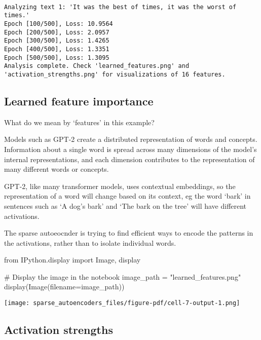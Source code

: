 \documentclass[
  letterpaper,
  DIV=11,
  numbers=noendperiod]{scrreprt}
\newenvironment{Shaded}{\begin{snugshade}}{\end{snugshade}}
\newcommand{\CommentTok}[1]{\textcolor[rgb]{0.37,0.37,0.37}{#1}}
\newcommand{\ImportTok}[1]{\textcolor[rgb]{0.00,0.46,0.62}{#1}}
\newcommand{\NormalTok}[1]{\textcolor[rgb]{0.00,0.23,0.31}{#1}}
\newcommand{\OperatorTok}[1]{\textcolor[rgb]{0.37,0.37,0.37}{#1}}
\newcommand{\StringTok}[1]{\textcolor[rgb]{0.13,0.47,0.30}{#1}}
\begin{document}
\begin{verbatim}

Analyzing text 1: 'It was the best of times, it was the worst of times.'
Epoch [100/500], Loss: 10.9564
Epoch [200/500], Loss: 2.0957
Epoch [300/500], Loss: 1.4265
Epoch [400/500], Loss: 1.3351
Epoch [500/500], Loss: 1.3095
Analysis complete. Check 'learned_features.png' and 'activation_strengths.png' for visualizations of 16 features.
\end{verbatim}

\subsection{Learned feature
importance}\label{learned-feature-importance}

What do we mean by `features' in this example?

Models such as GPT-2 create a distributed representation of words and
concepts. Information about a single word is spread across many
dimensions of the model's internal representations, and each dimension
contributes to the representation of many different words or concepts.

GPT-2, like many transformer models, uses contextual embeddings, so the
representation of a word will change based on its context, eg the word
`bark' in sentences such as `A dog's bark' and `The bark on the tree'
will have different activations.

The sparse autoeocnder is trying to find efficient ways to encode the
patterns in the activations, rather than to isolate individual words.

\begin{Shaded}
\begin{Highlighting}[]
\ImportTok{from}\NormalTok{ IPython.display }\ImportTok{import}\NormalTok{ Image, display}

\CommentTok{\# Display the image in the notebook}
\NormalTok{image\_path }\OperatorTok{=} \StringTok{"learned\_features.png"}
\NormalTok{display(Image(filename}\OperatorTok{=}\NormalTok{image\_path))}
\end{Highlighting}
\end{Shaded}

\texttt{[image: sparse\_autoencoders\_files/figure-pdf/cell-7-output-1.png]}

\subsection{Activation strengths}\label{activation-strengths}
\end{document}
